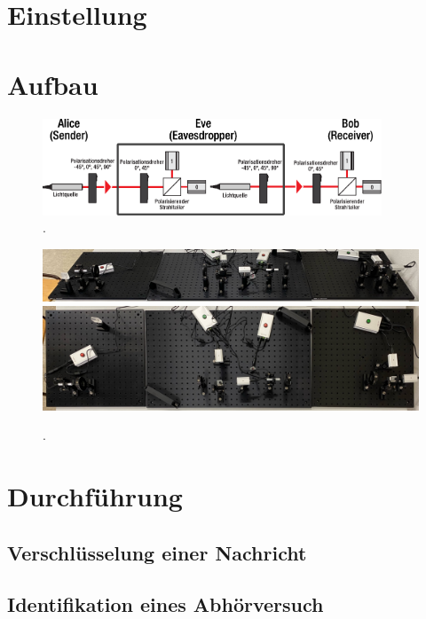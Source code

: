 \newpage
\section{Einstellung}

\section{Aufbau}

\begin{figure}[H]
	\centering
	\includegraphics[width=0.9\textwidth]{content/aufbau/schema.pdf}
	\caption{. \cite{krypt}}
	\label{fig:schema}
\end{figure}

\begin{figure}[H]
	\centering
	\includegraphics[width=1.0\textwidth]{content/aufbau/front.jpg}\\[1ex]
	\includegraphics[width=1.0\textwidth]{content/aufbau/drauf.jpg}
	\caption{.}
	\label{fig:aufbau}
\end{figure}

\section{Durchführung}

\subsection{Verschlüsselung einer Nachricht}

\subsection{Identifikation eines Abhörversuch}
